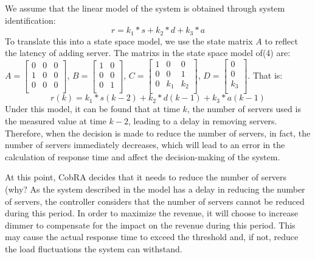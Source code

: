\documentclass[sigconf]{acmart}
\begin{document}
We assume that the linear model of the system is obtained through system identification:
\begin{equation}
	r=k_1 *s+k_2 *d+k_3*a
\end{equation}
To translate this into a state space model, we use the state matrix $A$ to reflect the latency of adding server. The matrixs in the state space model of(4) are:
$A={\left[\begin{array}{ccc}
	0&0&0\\
	1&0&0\\
	0&0&0\\
	\end{array}
	\right]
}$, $B={\left[\begin{array}{ccc}
1&0\\0&0\\
0&1\\
\end{array}
\right]}$, $C={\left[\begin{array}{ccc}
1&0&0\\
0&0&1\\
0&k_1&k_2\\
\end{array}
\right]
}$, $D={\left[\begin{array}{ccc}
0\\
0\\
k_3\\
\end{array}
\right]
}$.
That is: 
\begin{equation}
r(k)=k_1 *s(k-2)+k_2 *d(k-1)+k_3*a(k-1)
\end{equation}
Under this model, it can be found that at time $k$, the number of servers used is the measured value at time $k-2$, leading to a delay in removing servers.
Therefore, when the decision is made to reduce the number of servers, in fact, the number of servers immediately decreases, which will lead to an error in the calculation of response time and affect the decision-making of the system.

At this point, CobRA decides that it needs to reduce the number of servers (why?
As the system described in the model has a delay in reducing the number of servers, the controller considers that the number of servers cannot be reduced during this period. In order to maximize the revenue, it will choose to increase dimmer to compensate for the impact on the revenue during this period.
This may cause the actual response time to exceed the threshold and, if not, reduce the load fluctuations the system can withstand.
\end{document}
